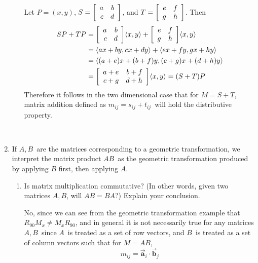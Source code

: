 \documentclass{letter}
\newcommand{\Ve}[1]{\langle #1 \rangle}
\newcommand{\Vn}[1]{\vec{\bm{#1}}}
\newcommand{\?}{\stackrel{?}{=}}
\newcommand\Que[1]{%
   \leavevmode\noindent
   #1
}
\newcommand\Ans[2][]{%
   \leavevmode\noindent
   {
       \begin{mdframed}[backgroundcolor=blue!10]
       #2
       \end{mdframed}
   }
}
\newenvironment{Mat}[1]{%
  \left[\begin{array}{*{#1}{r}}
}{%
  \end{array}\right]
}
\begin{document}
\begin{enumerate}
\begin{enumerate}[label=(\alph*)]
{        }
        \Ans{
        Let $P=(x,y)$, 
            $S = \begin{Mat}{2} a & b \\ c & d \end{Mat}$,
            and  
            $T=\begin{Mat}{2} e & f \\ g & h \end{Mat}$.
            Then 
            \begin{align*}
              SP+TP &= \begin{Mat}{2} a & b \\ c & d \end{Mat}\Ve{x , y} +
                       \begin{Mat}{2} e & f \\ g & h \end{Mat}\Ve{x , y} \\
                    &= \Ve{ax+by , cx+dy} +  \Ve{ex+fy , gx+hy} \\
                    &= \Ve{(a+e)x + (b+f)y, (c+g)x+(d+h)y} \\
                    &= \begin{Mat}{2} a+e & b+f \\ c+g & d+h \end{Mat}\Ve{x,y}
                     = (S+T)P            
            \end{align*}
            Therefore it follows in the two dimensional case that for $M=S+T$, matrix addition defined as $m_{ij}=s_{ij}+t_{ij}$\ will hold the distributive property. 
        }
    \end{enumerate}
    ~\\
    \item 
        If $A,B$\ are the matrices corresponding to a geometric transformation, we interpret the matrix product $AB$\ as the geometric transformation produced by applying $B$ first, then applying $A$.  
    \begin{enumerate}[label=(\alph*)]
    \item \Que{
        Is matrix multiplication commutative? (In other words, given two matrices $A, B$, will $AB = BA$?)  Explain your conclusion.
    }
    \Ans{
    No, since we can see from the geometric transformation example that $R_{90}M_x \not= M_xR_{90}$, and in general it is not necessarily true for any matrices $A,B$\ since $A$\ is treated as a set of row vectors, and $B$\ is treated as a set of column vectors such that for $M=AB$, 
    \[
        m_{ij} = \Vn{a}_i \cdot \Vn{b}_j
\]}
\end{enumerate}
\end{enumerate}
\end{document}
